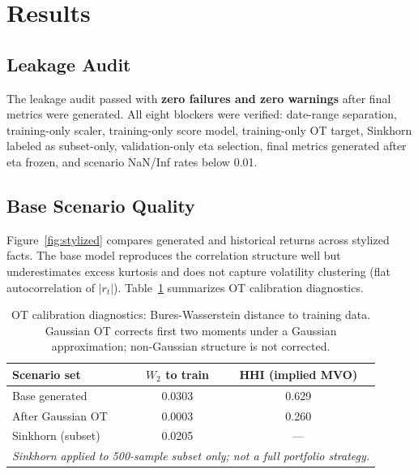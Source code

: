 \documentclass{article}
\newcommand{\WW}{W_2}
\begin{document}
\section{Results}
\label{sec:results}

\subsection{Leakage Audit}

The leakage audit passed with \textbf{zero failures and zero warnings} after final
metrics were generated. All eight blockers were verified: date-range separation,
training-only scaler, training-only score model, training-only OT target, Sinkhorn
labeled as subset-only, validation-only eta selection, final metrics generated after
eta frozen, and scenario NaN/Inf rates below 0.01.

\subsection{Base Scenario Quality}

Figure~\ref{fig:stylized} compares generated and historical returns across stylized
facts. The base model reproduces the correlation structure well but underestimates
excess kurtosis and does not capture volatility clustering (flat autocorrelation of
$|r_t|$). Table~\ref{tab:ot-diag} summarizes OT calibration diagnostics.

\begin{table}[ht]
\centering
\caption{OT calibration diagnostics: Bures-Wasserstein distance to training data.
Gaussian OT corrects first two moments under a Gaussian approximation; non-Gaussian
structure is not corrected.}
\label{tab:ot-diag}
\begin{tabular}{lcc}
\toprule
\textbf{Scenario set} & \textbf{$\WW$ to train} & \textbf{HHI (implied MVO)} \\
\midrule
Base generated      & 0.0303 & 0.629 \\
After Gaussian OT   & 0.0003 & 0.260 \\
Sinkhorn (subset)   & 0.0205 & --- \\
\midrule
\multicolumn{3}{l}{\small \textit{Sinkhorn applied to 500-sample subset only; not a full portfolio strategy.}} \\
\bottomrule
\end{tabular}
\end{table}
\end{document}
